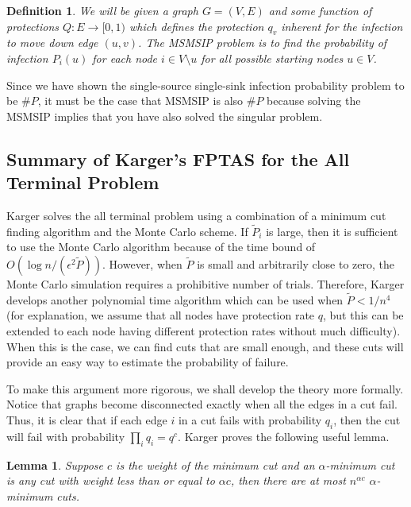 \documentclass{article}
\theoremstyle{plain}
\newtheorem{definition}{Definition}
\newtheorem{lemma}{Lemma}
\begin{document}
\begin{definition}
    We will be given a graph $G = (V,E)$ and some function of protections $Q: E \to [0,1)$ which defines the protection $q_v$ inherent for the infection to move down edge $(u,v)$. The \emph{MSMSIP problem} is to find the probability of infection $P_i(u)$ for each node $i \in V \setminus u$ for all possible starting nodes $u \in V$.
  \end{definition}

  Since we have shown the single-source single-sink infection probability problem to be $\# P$, it must be the case that MSMSIP is also $\# P$ because solving the MSMSIP implies that you have also solved the singular problem.

\subsection{Summary of Karger's FPTAS for the All Terminal Problem}

Karger solves the all terminal problem using a combination of a minimum cut finding algorithm and the Monte Carlo scheme. If $\tilde{P}_i$ is large, then it is sufficient to use the Monte Carlo algorithm because of the time bound of $O(\log n / (\epsilon^2 \tilde{P}))$. However, when $\tilde{P}$ is small and arbitrarily close to zero, the Monte Carlo simulation requires a prohibitive number of trials. Therefore, Karger develops another polynomial time algorithm which can be used when $\tilde{P} < 1/n^4$ (for explanation, we assume that all nodes have protection rate $q$, but this can be extended to each node having different protection rates without much difficulty). When this is the case, we can find cuts that are small enough, and these cuts will provide an easy way to estimate the probability of failure.

To make this argument more rigorous, we shall develop the theory more formally. Notice that graphs become disconnected exactly when all the edges in a cut fail. Thus, it is clear that if each edge $i$ in a cut fails with probability $q_i$, then the cut will fail with probability $\prod_i q_i = q^c$. Karger proves the following useful lemma.

\begin{lemma}
  Suppose $c$ is the weight of the minimum cut and an $\alpha$-minimum cut is any cut with weight less than or equal to $\alpha c$, then there are at most $n^{\alpha c}$ $\alpha$-minimum cuts.
\end{lemma}
\end{document}
